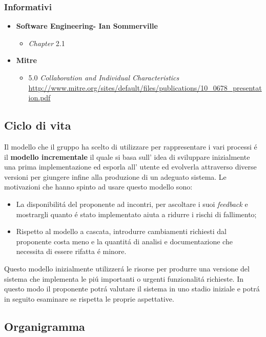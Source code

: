 \subsubsection{Informativi}
\begin{itemize}
\item \textbf{Software Engineering- Ian Sommerville}
	\begin{itemize}
	\item \textit{Chapter} 2.1
	\end{itemize}
\item \textbf{Mitre}
	\begin{itemize} 
	\item 5.0 \textit{Collaboration and Individual Characteristics} \url{http://www.mitre.org/sites/default/files/publications/10_0678_presentation.pdf}
	\end{itemize}
\end{itemize}
\subsection{Ciclo di vita}
\label{subsec:ciclodivita}
Il modello che il gruppo \gruppo ha scelto di utilizzare per rappresentare i vari processi \'e il \textbf{modello incrementale} il quale si basa sull' idea di sviluppare inizialmente una prima implementazione ed esporla all' utente ed evolverla attraverso diverse versioni per giungere infine alla produzione di un adeguato sistema. Le motivazioni che hanno spinto ad usare questo modello sono:
\begin{itemize}
	\item La disponibilit\'a del proponente ad incontri, per ascoltare i suoi \textit{feedback} e mostrargli quanto \'e stato implementato aiuta a ridurre i rischi di fallimento;
	\item Rispetto al modello a cascata, introdurre cambiamenti richiesti dal proponente costa meno e la quantit\'a di analisi e documentazione che necessita di essere rifatta \'e minore.
\end{itemize}
Questo modello inizialmente utilizzer\'a le risorse per produrre una versione del sistema che implementa le pi\'u importanti o urgenti funzionalit\'a richieste. In questo modo il proponente potr\'a valutare il sistema in uno stadio iniziale e potr\'a in seguito esaminare se rispetta le proprie aspettative.

\subsection{Organigramma}
